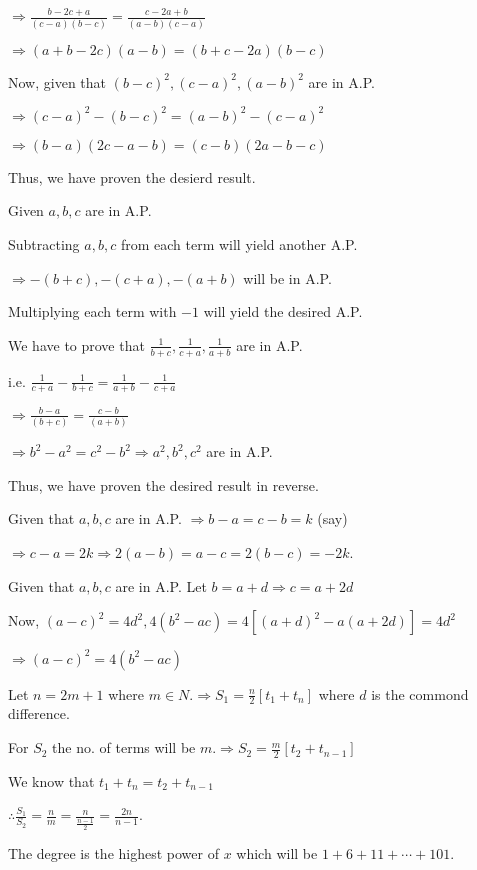   $\Rightarrow \frac{b -2c + a}{(c - a)(b - c)} = \frac{c - 2a + b}{(a - b)(c - a)}$

  $\Rightarrow (a + b - 2c)(a - b) = (b + c - 2a)(b - c)$

  Now, given that $(b - c)^2, (c - a)^2, (a - b)^2$ are in A.P.

  $\Rightarrow (c - a)^2 - (b - c)^2 = (a - b)^2 - (c - a)^2$

  $\Rightarrow (b - a)(2c - a - b) = (c - b)(2a - b - c)$

  Thus, we have proven the desierd result.
\item Given $a, b, c$ are in A.P.

  Subtracting $a, b, c$ from each term will yield another A.P.

  $\Rightarrow -(b + c), -(c + a), -(a + b)$ will be in A.P.

  Multiplying each term with $-1$ will yield the desired A.P.
\item We have to prove that $\frac{1}{b + c}, \frac{1}{c + a}, \frac{1}{a + b}$ are in A.P.

  i.e. $\frac{1}{c + a} - \frac{1}{b + c} = \frac{1}{a + b} - \frac{1}{c + a}$

  $\Rightarrow \frac{b - a}{(b + c)} = \frac{c - b}{(a + b)}$

  $\Rightarrow b^2 - a^2 = c^2 - b^2 \Rightarrow a^2, b^2, c^2$ are in A.P.

  Thus, we have proven the desired result in reverse.
\item Given that $a, b, c$ are in A.P. $\Rightarrow b - a = c - b = k$ (say)

  $\Rightarrow c - a = 2k \Rightarrow 2(a - b) = a - c = 2(b - c) = -2k$.
\item Given that $a, b, c$ are in A.P. Let $b = a + d \Rightarrow c = a + 2d$

  Now, $(a - c)^2 = 4d^2, 4(b^2 - ac) = 4[(a + d)^2 - a(a + 2d)] = 4d^2$

  $\Rightarrow (a - c)^2 = 4(b^2 - ac)$
\item Let $n = 2m + 1$ where $m\in N. \Rightarrow S_1 = \frac{n}{2}[t_1 + t_n]$ where $d$ is the commond difference.

  For $S_2$ the no. of terms will be $m. \Rightarrow S_2 = \frac{m}{2}[t_2 + t_{n - 1}]$

  We know that $t_1 + t_n = t_2 + t_{n - 1}$

  $\therefore \frac{S_1}{S_2} = \frac{n}{m} = \frac{n}{\tfrac{n - 1}{2}} = \frac{2n}{n - 1}$.
\item The degree is the highest power of $x$ which will be $1 + 6 + 11 + \cdots + 101$.

